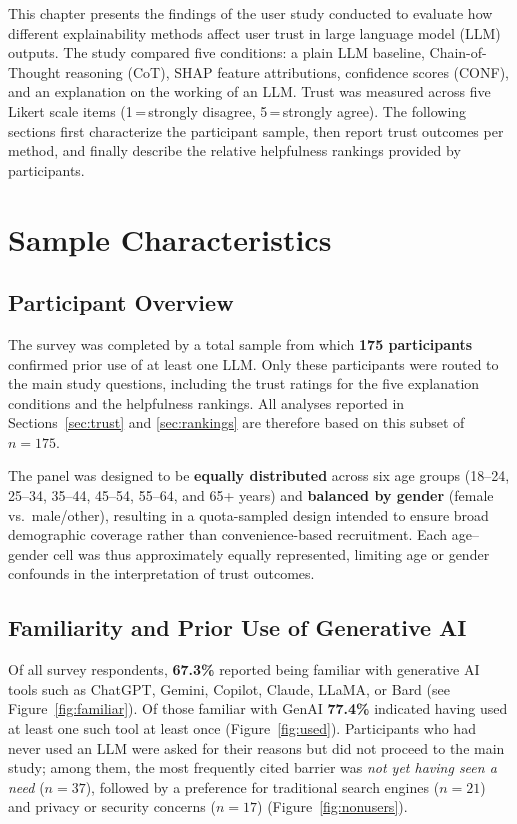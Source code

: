 
This chapter presents the findings of the user study conducted to evaluate how different
explainability methods affect user trust in large language model (LLM) outputs. The study
compared five conditions: a plain LLM baseline, Chain-of-Thought reasoning (CoT), SHAP
feature attributions, confidence scores (CONF), and an explanation on the working of an LLM.
Trust was measured across five Likert scale items (1\,=\,strongly disagree,
5\,=\,strongly agree). The following sections first characterize the participant sample,
then report trust outcomes per method, and finally describe the relative helpfulness
rankings provided by participants.

\section{Sample Characteristics}
\label{sec:sample}
 
\subsection{Participant Overview}
 
The survey was completed by a total sample from which \textbf{175 participants} confirmed
prior use of at least one LLM. Only these participants were routed to the main study
questions, including the trust ratings for the five explanation conditions and the
helpfulness rankings. All analyses reported in Sections~\ref{sec:trust} and
\ref{sec:rankings} are therefore based on this subset of $n = 175$.
 
The panel was designed to be \textbf{equally distributed} across six age groups
(18--24, 25--34, 35--44, 45--54, 55--64, and 65+ years) and \textbf{balanced by
gender} (female vs.\ male/other), resulting in a quota-sampled design intended to ensure
broad demographic coverage rather than convenience-based recruitment. Each age--gender
cell was thus approximately equally represented, limiting age or gender confounds in
the interpretation of trust outcomes.
 
\subsection{Familiarity and Prior Use of Generative AI}
 
Of all survey respondents, \textbf{67.3\%} reported being familiar with generative AI
tools such as ChatGPT, Gemini, Copilot, Claude, LLaMA, or Bard (see
Figure~\ref{fig:familiar}). Of those familiar with GenAI \textbf{77.4\%} indicated having
used at least one such tool at least once (Figure~\ref{fig:used}). Participants who had
never used an LLM were asked for their reasons but did not proceed to the main study;
among them, the most frequently cited barrier was \emph{not yet having seen a need}
($n=37$), followed by a preference for traditional search engines ($n=21$) and privacy or
security concerns ($n=17$) (Figure~\ref{fig:nonusers}).
 
